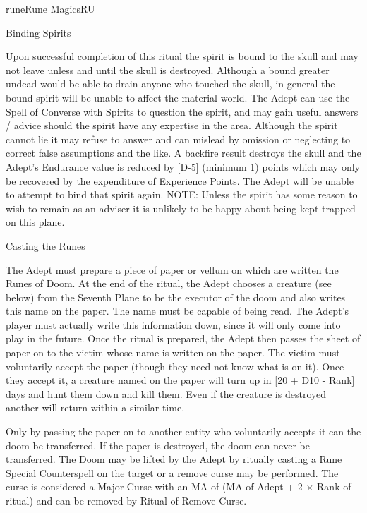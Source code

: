 \begin{College}[2.2]{rune}{Rune Magics}{RU}
\begin{ritual}[R-2]{Binding Spirits}
\begin{effects}
Upon successful completion of this ritual the spirit is bound to the
skull and may not leave unless and until the skull is destroyed.
Although a bound greater undead would be able to drain anyone who
touched the skull, in general the bound spirit will be unable to
affect the material world.  The Adept can use the Spell of Converse
with Spirits to question the spirit, and may gain useful answers /
advice should the spirit have any expertise in the area. Although the
spirit cannot lie it may refuse to answer and can mislead by omission
or neglecting to correct false assumptions and the like.  A backfire
result destroys the skull and the Adept’s Endurance value is reduced
by [D-5] (minimum 1) points which may only be recovered by the
expenditure of Experience Points.  The Adept will be unable to attempt
to bind that spirit again.  NOTE: Unless the spirit has some reason to
wish to remain as an adviser it is unlikely to be happy about being
kept trapped on this plane.
\end{effects}
\end{ritual}

\begin{ritual}[R-3]{Casting the Runes}

\begin{effects}
The Adept must prepare a piece of paper or vellum on which are written
the Runes of Doom.  At the end of the ritual, the Adept chooses a
creature (see below) from the Seventh Plane to be the executor of the
doom and also writes this name on the paper. The name must be capable
of being read.  The Adept’s player must actually write this
information down, since it will only come into play in the future.
Once the ritual is prepared, the Adept then passes the sheet of paper
on to the victim whose name is written on the paper.  The victim must
voluntarily accept the paper (though they need not know what is on
it).  Once they accept it, a creature named on the paper will turn up
in [20 + D10 - Rank] days and hunt them down and kill them.  Even if
the creature is destroyed another will return within a similar time.

Only by passing the paper on to another entity who voluntarily accepts
it can the doom be transferred.  If the paper is destroyed, the doom
can never be transferred. The Doom may be lifted by the Adept by
ritually casting a Rune Special Counterspell on the target or a remove
curse may be performed.  The curse is considered a Major Curse with an
MA of (MA of Adept + 2 × Rank of ritual) and can be removed by Ritual
of Remove Curse.


\end{effects}
\end{ritual}
\end{College}
